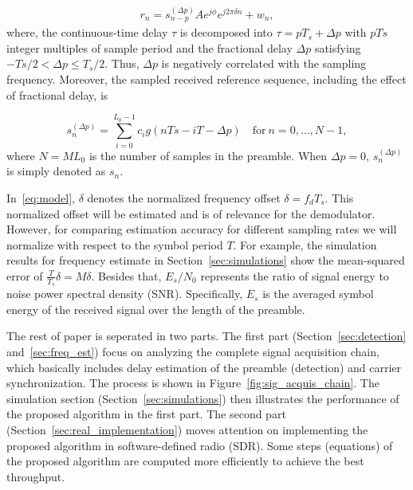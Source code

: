 \begin{equation}
    \begin{aligned}
      \label{eq:model}
      r_n = s_{n-p}^{(\Delta p)}Ae^{j\phi}e^{j2\pi\delta n}+w_{n},
    \end{aligned}
  \end{equation}
where, the continuous-time delay $\tau$ is decomposed into $\tau=pT_s+\Delta p$ with $pTs$ integer multiples of sample period and 
the fractional delay $\Delta p$ satisfying $-Ts/2 {<} \Delta p {\leq} T_s/2$. Thus, $\Delta p$ is negatively correlated with
the sampling frequency. Moreover, the sampled received reference sequence, including the effect of fractional delay, is

\begin{equation}
  \label{eq:l_ref_sig_discrete}
  s_n^{(\Delta p)} = \sum_{i=0}^{L_0-1} c_i g(nTs-iT-\Delta p) \quad \text{for}~n=0,\ldots,N-1,
\end{equation}
where $N=ML_0$ is the number of samples in the preamble. When $\Delta p=0$, $s_n^{(\Delta p)}$ is simply denoted as $s_n$.

In~\eqref{eq:model}, $\delta$ denotes the normalized frequency offset $\delta=f_dT_s$. This normalized offset
will be estimated and is of relevance for the demodulator. However, for comparing estimation accuracy for different
sampling rates we will normalize with respect to the symbol period $T$. For example, the simulation results for frequency estimate 
in Section~\ref{sec:simulations} show the mean-squared error of $\frac{T}{T_s}\delta=M\delta$.
Besides that, $E_s/N_0$ represents the ratio of signal energy to noise power spectral density (SNR).
Specifically, $E_s$ is the averaged symbol energy of the received signal over the length of the preamble.

The rest of paper is seperated in two parts. The first part (Section~\ref{sec:detection} and~\ref{sec:freq_est}) focus on analyzing the complete
signal acquisition chain, which basically includes delay estimation of the preamble (detection) and
carrier synchronization. The process is shown in Figure~\ref{fig:sig_acquis_chain}.
The simulation section (Section~\ref{sec:simulations}) then illustrates the performance of the proposed algorithm in the first part.
The second part (Section~\ref{sec:real_implementation}) moves attention on implementing the proposed algorithm 
in software-defined radio (SDR). Some steps (equations) of the proposed algorithm are computed more efficiently to achieve the best throughput.

